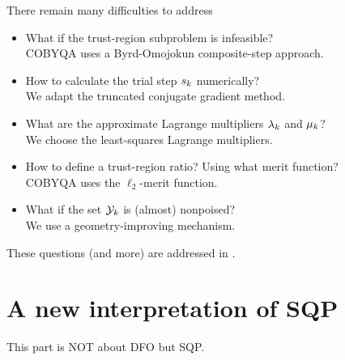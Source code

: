 \documentclass[
]{talk}
\newcommand*{\lmeq}[1][]{\mu\ifblank{#1}{}{_{#1}}}
\newcommand*{\lmub}[1][]{\lambda\ifblank{#1}{}{_{#1}}}
\newcommand*{\step}[1][]{s\ifblank{#1}{}{_{#1}}}
\newcommand*{\xpt}[1][]{\mathcal{Y}\ifblank{#1}{}{_{#1}}}
\begin{document}
\begin{frame}{There remain many difficulties to address}
    \begin{itemize}
        \setlength\itemsep{0.5em}
        \item What if the trust-region subproblem is \alert{infeasible}?\\
        \textcolor{FernGreen}{COBYQA uses a Byrd-Omojokun composite-step approach.}
        \item How to calculate the trial step $\step[k]$ \alert{numerically}?\\
        \textcolor{FernGreen}{We adapt the truncated conjugate gradient method.}
        \item What are the approximate Lagrange multipliers $\lmub[k]$ and $\lmeq[k]$?\\
        \textcolor{FernGreen}{We choose the least-squares Lagrange multipliers.}
        \item How to define a trust-region ratio? Using what merit function?\\
        \textcolor{FernGreen}{COBYQA uses the $\ell_2$-merit function.}
        \item What if the set $\xpt[k]$ is (almost) nonpoised?\\
        \textcolor{FernGreen}{We use a geometry-improving mechanism.}
    \end{itemize}

    \medskip

    These questions (and more) are addressed in \textcite{Ragonneau_2022}.
\end{frame}

\section{A new interpretation of SQP}

\begin{frame}[standout]
     This part is \alert{NOT} about DFO but SQP.
\end{frame}
\end{document}
